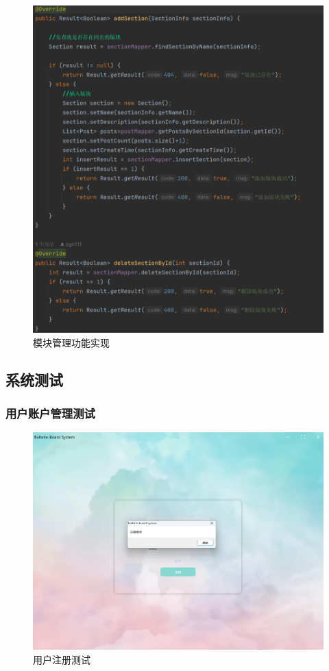 \documentclass[UTF8]{ctexart}
\begin{document}
\begin{figure}[H]
  \centering
  \includegraphics[scale=0.3]{系统实现/模块功能实现.png}
  \caption{模块管理功能实现}
\end{figure}


\subsection{系统测试}

\subsubsection{用户账户管理测试}

\begin{figure}[H]
  \centering
  \includegraphics[scale=0.3]{测试/注册.png}
  \caption{用户注册测试}
\end{figure}
\end{document}
